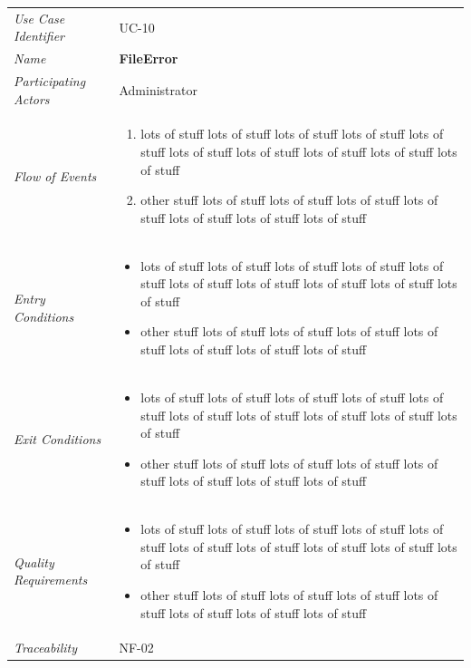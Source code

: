 \documentclass[12pt,letterpaper]{article}
\begin{document}
\begin{center}
	\begin{tabu} to 
		\toprule
		Use Case Identifier & UC-10 \\
		Name & {\bf FileError} \\
		Participating Actors & Administrator \\
		Flow of Events & 
	    \begin{enumerate}[topsep=-1em]
		    \item lots of stuff lots of stuff lots of stuff lots of stuff lots of stuff lots of stuff lots of stuff lots of stuff lots of stuff lots of stuff
		    \item other stuff lots of stuff lots of stuff lots of stuff lots of stuff lots of stuff lots of stuff lots of stuff
		\end{enumerate} \\

		Entry Conditions &
		\begin{itemize}[topsep=-1em]
		    \item lots of stuff lots of stuff lots of stuff lots of stuff lots of stuff lots of stuff lots of stuff lots of stuff lots of stuff lots of stuff
		    \item other stuff lots of stuff lots of stuff lots of stuff lots of stuff lots of stuff lots of stuff lots of stuff
        \end{itemize} \\

		Exit Conditions &
		\begin{itemize}[topsep=-1em]
		    \item lots of stuff lots of stuff lots of stuff lots of stuff lots of stuff lots of stuff lots of stuff lots of stuff lots of stuff lots of stuff
		    \item other stuff lots of stuff lots of stuff lots of stuff lots of stuff lots of stuff lots of stuff lots of stuff
        \end{itemize} \\

		Quality Requirements &
		\begin{itemize}[topsep=-1em]
		    \item lots of stuff lots of stuff lots of stuff lots of stuff lots of stuff lots of stuff lots of stuff lots of stuff lots of stuff lots of stuff
		    \item other stuff lots of stuff lots of stuff lots of stuff lots of stuff lots of stuff lots of stuff lots of stuff
        \end{itemize} \\

		Traceability & NF-02 \\
		\toprule
	\end{tabu}
\end{center}
\end{document}

